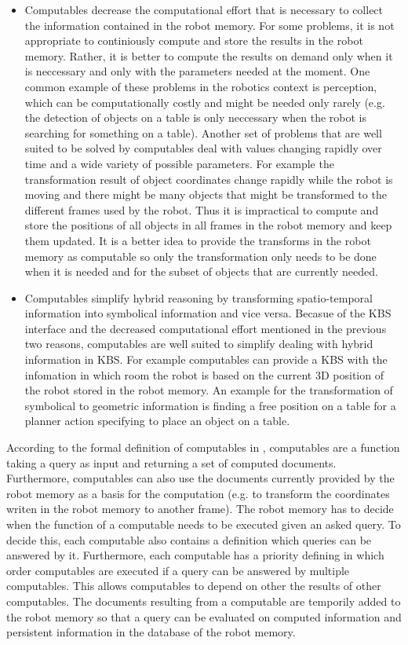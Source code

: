 {\begin{itemize}
\item Computables decrease the computational effort that is necessary
  to collect the information contained in the robot memory. For some
  problems, it is not appropriate to continiously compute and store
  the results in the robot memory. Rather, it is better to compute the
  results on demand only when it is neccessary and only with the
  parameters needed at the moment. One common example of these
  problems in the robotics context is perception, which can be
  computationally costly and might be needed only rarely (e.g. the
  detection of objects on a table is only neccessary when the robot is
  searching for something on a table). Another set of problems that
  are well suited to be solved by computables deal with values
  changing rapidly over time and a wide variety of possible
  parameters. For example the transformation result of object
  coordinates change rapidly while the robot is moving and there might
  be many objects that might be transformed to the different frames
  used by the robot. Thus it is impractical to compute and store the
  positions of all objects in all frames in the robot memory and keep
  them updated. It is a better idea to provide the transforms in the
  robot memory as computable so only the transformation only needs to
  be done when it is needed and for the subset of objects that are
  currently needed.

\item Computables simplify hybrid reasoning by transforming
  spatio-temporal information into symbolical information and vice
  versa. Becasue of the KBS interface and the decreased computational
  effort mentioned in the previous two reasons, computables are well
  suited to simplify dealing with hybrid information in KBS. For
  example computables can provide a KBS with the infomation in which
  room the robot is based on the current 3D position of the robot
  stored in the robot memory. An example for the transformation of
  symbolical to geometric information is finding a free position on a
  table for a planner action specifying to place an object on a table.
\end{itemize}

According to the formal definition of computables in
, computables are a function taking a query as
input and returning a set of computed documents. Furthermore,
computables can also use the documents currently provided by the robot
memory as a basis for the computation (e.g. to transform the
coordinates writen in the robot memory to another frame). The robot
memory has to decide when the function of a computable needs to be
executed given an asked query. To decide this, each computable also
contains a definition which queries can be answered by
it. Furthermore, each computable has a priority defining in which
order computables are executed if a query can be answered by multiple
computables. This allows computables to depend on other the results of
other computables. The documents resulting from a computable are
temporily added to the robot memory so that a query can be evaluated
on computed information and persistent information in the database of
the robot memory.

}
